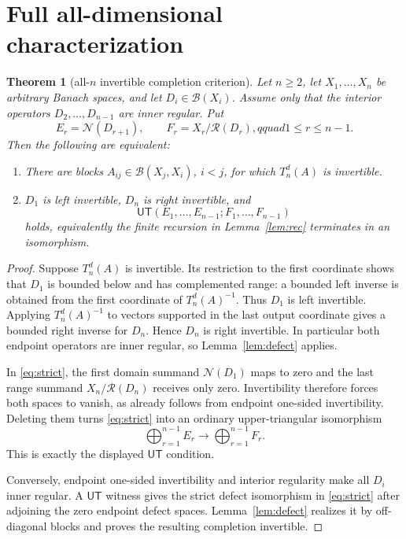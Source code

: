 \documentclass[11pt]{article}
\newtheorem{theorem}{Theorem}
\newcommand{\B}{\mathcal B}
\newcommand{\N}{\mathcal N}
\newcommand{\R}{\mathcal R}
\newcommand{\UT}{\mathsf{UT}}
\begin{document}
\section{Full all-dimensional characterization}

\begin{theorem}[all-$n$ invertible completion criterion]\label{thm:main}
Let $n\geq2$, let $X_1,\ldots,X_n$ be arbitrary Banach spaces, and let
$D_i\in\B(X_i)$.  Assume only that the interior operators
$D_2,\ldots,D_{n-1}$ are inner regular.  Put
\[
 E_r=\N(D_{r+1}),\qquad F_r=X_r/\R(D_r),qquad 1\leq r\leq n-1.
\]
Then the following are equivalent:
\begin{enumerate}
\item There are blocks $A_{ij}\in\B(X_j,X_i)$, $i<j$, for which
$T_n^d(A)$ is invertible.
\item $D_1$ is left invertible, $D_n$ is right invertible, and
\[
 \boxed{\ \UT(E_1,\ldots,E_{n-1};F_1,\ldots,F_{n-1})\ }
\]
holds, equivalently the finite recursion in Lemma~\ref{lem:rec} terminates in
an isomorphism.
\end{enumerate}
\end{theorem}

\begin{proof}
Suppose $T_n^d(A)$ is invertible.  Its restriction to the first coordinate
shows that $D_1$ is bounded below and has complemented range: a bounded left
inverse is obtained from the first coordinate of $T_n^d(A)^{-1}$.  Thus
$D_1$ is left invertible.  Applying $T_n^d(A)^{-1}$ to vectors supported in
the last output coordinate gives a bounded right inverse for $D_n$.  Hence
$D_n$ is right invertible.  In particular both endpoint operators are inner
regular, so Lemma~\ref{lem:defect} applies.

In \eqref{eq:strict}, the first domain summand $\N(D_1)$ maps to zero and the
last range summand $X_n/\R(D_n)$ receives only zero.  Invertibility therefore
forces both spaces to vanish, as already follows from endpoint one-sided
invertibility.  Deleting them turns \eqref{eq:strict} into an ordinary
upper-triangular isomorphism
\[
 \bigoplus_{r=1}^{n-1}E_r\longrightarrow\bigoplus_{r=1}^{n-1}F_r.
\]
This is exactly the displayed $\UT$ condition.

Conversely, endpoint one-sided invertibility and interior regularity make all
$D_i$ inner regular.  A $\UT$ witness gives the strict defect isomorphism
in \eqref{eq:strict} after adjoining the zero endpoint defect spaces.
Lemma~\ref{lem:defect} realizes it by off-diagonal blocks and proves the
resulting completion invertible.
\end{proof}
\end{document}
